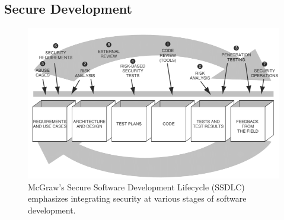 \documentclass[9pt]{extarticle}
\begin{document}
  \begin{multicols}{2}
  \subsection*{Secure Development}
  

  \end{multicols}
\newpage
\begin{figure}[h]
    \begin{center}
        \includegraphics[width=0.5\linewidth]{images/McGraws-Secure-Software-Development-Life-Cycle-Process.png}
    \caption{McGraw's Secure Software Development Lifecycle (SSDLC) emphasizes integrating security at various stages of software development.}
    \end{center}
\end{figure}
\end{document}
